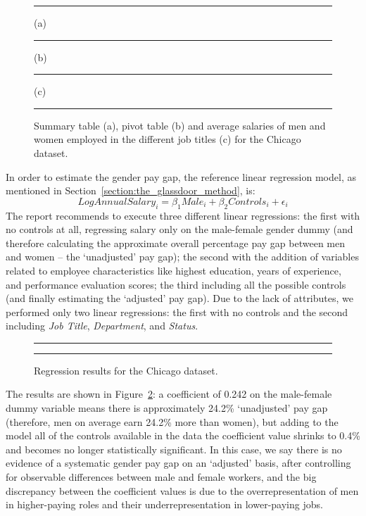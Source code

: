 \begin{figure}[t!]
\centering
\noindent\rule{\linewidth}{0.4pt}\par
\caption*{(a)}
\noindent\rule{\linewidth}{0.4pt}\par
\caption*{(b)}
\noindent\rule{\linewidth}{0.4pt}\par
\caption*{(c)}
\noindent\rule{\linewidth}{0.4pt}
\caption{Summary table (a), pivot table (b) and average salaries of men and women employed in the different job titles (c) for the Chicago dataset.}
\label{fig:chicago_glassdoor1}
\end{figure}

In order to estimate the gender pay gap, the reference linear regression model, as mentioned in Section~\ref{section:the_glassdoor_method}, is: \[\mathit{Log Annual Salary}_i = \beta_1\textit{Male}_i + \beta_2\mathit{Controls}_i + \epsilon_i\]
The report recommends to execute three different linear regressions: the first with no controls at all, regressing salary only on the male-female gender dummy (and therefore calculating the approximate overall percentage pay gap between men and women -- the `unadjusted' pay gap); the second with the addition of variables related to employee characteristics like highest education, years of experience, and performance evaluation scores; the third including all the possible controls (and finally estimating the `adjusted' pay gap). Due to the lack of attributes, we performed only two linear regressions: the first with no controls and the second including \textit{Job Title}, \textit{Department}, and \textit{Status}.

\begin{figure}[t!]
\centering
\noindent\rule{\linewidth}{0.4pt}\par
\noindent\rule{\linewidth}{0.4pt}
\caption{Regression results for the Chicago dataset.}
\label{fig:chicago_glassdoor2}
\end{figure}

The results are shown in Figure~\ref{fig:chicago_glassdoor2}: a coefficient of 0.242 on the male-female dummy variable means there is approximately 24.2\% `unadjusted' pay gap (therefore, men on average earn 24.2\% more than women), but adding to the model all of the controls available in the data the coefficient value shrinks to 0.4\% and becomes no longer statistically significant. In this case, we say there is no evidence of a systematic gender pay gap on an `adjusted' basis, after controlling for observable differences between male and female workers, and the big discrepancy between the coefficient values is due to the overrepresentation of men in higher-paying roles and their underrepresentation in lower-paying jobs.


